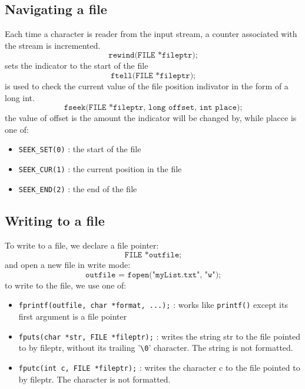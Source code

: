 \documentclass[a4paper, 10pt]{article}
\begin{document}
\subsection{Navigating a file}
Each time a character is reader from the input stream, a counter associated with the stream is incremented.
$$\texttt{rewind(FILE *fileptr);}$$
sets the indicator to the start of the file
$$\texttt{ftell(FILE *fileptr);}$$
is used to check the current value of the file position indivator in the form of a long int.
$$\texttt{fseek(FILE *fileptr, long offset, int place);}$$
the value of offset is the amount the indicator will be changed by, while placce is one of:
\begin{itemize}
    \item \texttt{SEEK\_SET(0)} : the start of the file
    \item \texttt{SEEK\_CUR(1)} : the current position in the file
    \item \texttt{SEEK\_END(2)} : the end of the file
\end{itemize}
\subsection{Writing to a file}
To write to a file, we declare a file pointer:
$$\texttt{FILE *outfile;}$$
and open a new file in write mode:
$$\texttt{outfile = fopen("myList.txt", "w");}$$
to write to the file, we use one of:
\begin{itemize}
    \item \texttt{fprintf(outfile, char *format, ...);} : works like \texttt{printf()} except its first argument is a file pointer
    \item \texttt{fputs(char *str, FILE *fileptr);} : writes the string str to the file pointed to by fileptr, without its trailing '\texttt{\textbackslash 0}' character. The string is not formatted.
    \item \texttt{fputc(int c, FILE *fileptr);} : writes the character c to the file pointed to by fileptr. The character is not formatted.
\end{itemize}
\end{document}
